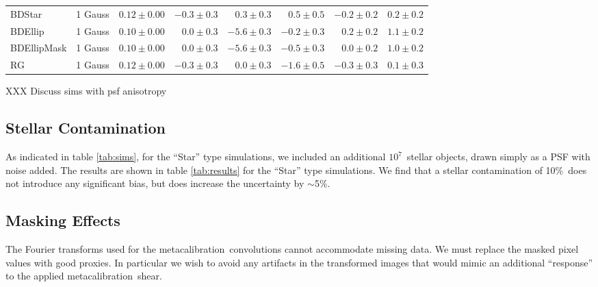 \documentclass[usegraphicx,usenatbib]{mn2e}
\newcommand{\mcal}{metacalibration}
\newcommand{\nsimNstar}{$10^7$}
\newcommand{\nsimNstarperc}{10\%}
\begin{document}
\begin{table}
\begin{tabular}{ |l|  |c| c|r|r|  r|r|r|}
        BDStar          & 1 Gauss & $0.12 \pm 0.00$ & $-0.3 \pm 0.3$ & $0.3 \pm 0.3$    & $ 0.5 \pm 0.5$ & $-0.2 \pm 0.2$ & $0.2 \pm 0.2$  \\
        BDEllip         & 1 Gauss & $0.10 \pm 0.00$ & $0.0 \pm 0.3$ & $-5.6 \pm 0.3$    & $-0.2 \pm 0.3$ & $0.2 \pm 0.2$ & $1.1 \pm 0.2$  \\
        BDEllipMask     & 1 Gauss & $0.10 \pm 0.00$ & $0.0 \pm 0.3$ & $-5.6 \pm 0.3$    & $-0.5 \pm 0.3$ & $0.0 \pm 0.2$ & $1.0 \pm 0.2$  \\
        RG              & 1 Gauss & $0.12 \pm 0.00$ & $-0.3 \pm 0.3$ & $0.0 \pm 0.3$      & $-1.6 \pm 0.5$ & $-0.3 \pm 0.3$ & $0.1 \pm 0.3$  \\
    \end{tabular}
\end{table}

XXX Discuss sims with psf anisotropy

\subsection{Stellar Contamination} \label{sec:stars}

As indicated in table \ref{tab:sims}, for the ``Star'' type simulations, we
included an additional \nsimNstar\ stellar objects, drawn simply as a PSF with
noise added.  The results are shown in table \ref{tab:results} for the ``Star''
type simulations.  We find that a stellar contamination of 
\nsimNstarperc\ does not introduce any significant bias, but does
increase the uncertainty by $\sim$5\%.

\subsection{Masking Effects} \label{sec:masking}

The Fourier transforms used for the \mcal\ convolutions cannot accommodate
missing data.  We must replace the masked pixel values with good proxies.  In
particular we wish to avoid any artifacts in the transformed images that would
mimic an additional ``response'' to the applied \mcal\ shear.
\end{document}
